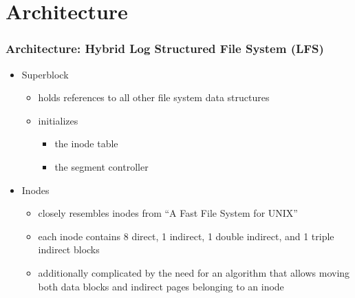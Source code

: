 \section{Architecture}
\begin{frame}
	\frametitle{Architecture: Hybrid Log Structured File System (LFS)}
	\begin{itemize}[<+->]
		\setlength\itemsep{1em}
		\item Superblock
			\begin{itemize}
				\item holds references to all other file system data structures
				\item initializes 
					\begin{itemize}
						\item the inode table 
						\item the segment controller
					\end{itemize}
			\end{itemize}
		\item Inodes
			\begin{itemize}
				\item closely resembles inodes from ``A Fast File System for UNIX''
				\item each inode contains 8 direct, 1 indirect, 1 double indirect, and 1 triple indirect blocks
				\item additionally complicated by the need for an algorithm that allows moving both data blocks and indirect pages belonging to an inode
			\end{itemize}
	\end{itemize}
\end{frame}


